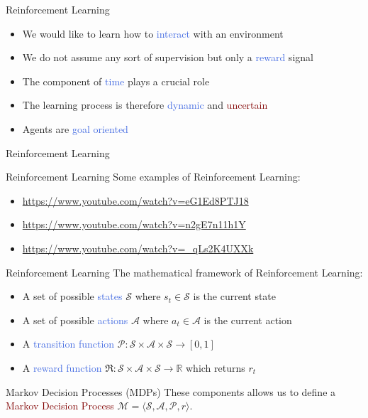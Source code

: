 \documentclass{beamer}
\begin{document}
\begin{frame}{Reinforcement Learning}
	\begin{itemize}
		\item We would like to learn how to \textcolor{RoyalBlue}{interact} with an environment 
		\item We do not assume any sort of supervision but only a \textcolor{RoyalBlue}{reward} signal
		\item The component of \textcolor{RoyalBlue}{time} plays a crucial role
		\item The learning process is therefore \textcolor{RoyalBlue}{dynamic} and \textcolor{Maroon}{uncertain} 
		\item Agents are \textcolor{RoyalBlue}{goal oriented}
	\end{itemize}

\end{frame}

\begin{frame}{Reinforcement Learning}
	\centering
	
\end{frame}

\begin{frame}{Reinforcement Learning}
Some examples of Reinforcement Learning:
	\begin{itemize}
		\item \url{https://www.youtube.com/watch?v=eG1Ed8PTJ18}
		\item \url{https://www.youtube.com/watch?v=n2gE7n11h1Y}
		\item \url{https://www.youtube.com/watch?v=_qLs2K4UXXk}
	\end{itemize}

\end{frame}


\begin{frame}{Reinforcement Learning}
	The mathematical framework of Reinforcement Learning:
	\begin{itemize}
		\item A set of possible \textcolor{RoyalBlue}{states} $\mathcal{S}$ where $s_t\in\mathcal{S}$ is the current state
		\item A set of possible \textcolor{RoyalBlue}{actions} $\mathcal{A}$ where $a_t\in\mathcal{A}$ is the current action
		\item A \textcolor{RoyalBlue}{transition function} $\mathcal{P}:\mathcal{S}\times\mathcal{A}\times\mathcal{S}\rightarrow[0,1]$
		\item A \textcolor{RoyalBlue}{reward function} $\Re:\mathcal{S}\times\mathcal{A}\times\mathcal{S}\rightarrow \mathbb{R}$ which returns $r_t$
	\end{itemize}

	\begin{block}{Markov Decision Processes (MDPs)}
		These components allows us to define a \textcolor{Maroon}{Markov Decision Process} 
		\centering $\mathcal{M}=\langle \mathcal{S},\mathcal{A},\mathcal{P},r\rangle$.
	\end{block}

\end{frame}
\end{document}
